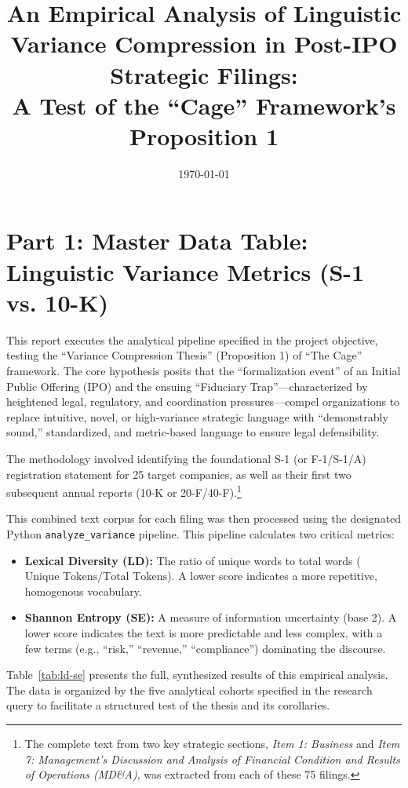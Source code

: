 \documentclass[12pt]{article}
\title{An Empirical Analysis of Linguistic Variance Compression in Post-IPO Strategic Filings:\\
A Test of the ``Cage'' Framework's Proposition 1}
\author{}
\date{\today}
\begin{document}
\maketitle

\section*{Part 1: Master Data Table: Linguistic Variance Metrics (S-1 vs. 10-K)}

This report executes the analytical pipeline specified in the project objective, testing the ``Variance Compression Thesis'' (Proposition 1) of ``The Cage'' framework. The core hypothesis posits that the ``formalization event'' of an Initial Public Offering (IPO) and the ensuing ``Fiduciary Trap''---characterized by heightened legal, regulatory, and coordination pressures---compel organizations to replace intuitive, novel, or high-variance strategic language with ``demonstrably sound,'' standardized, and metric-based language to ensure legal defensibility.

The methodology involved identifying the foundational S-1 (or F-1/S-1/A) registration statement for 25 target companies, as well as their first two subsequent annual reports (10-K or 20-F/40-F).\footnote{The complete text from two key strategic sections, \emph{Item 1: Business} and \emph{Item 7: Management's Discussion and Analysis of Financial Condition and Results of Operations (MD\&A)}, was extracted from each of these 75 filings.}

This combined text corpus for each filing was then processed using the designated Python \texttt{analyze\_variance} pipeline. This pipeline calculates two critical metrics:
\begin{itemize}
    \item \textbf{Lexical Diversity (LD):} The ratio of unique words to total words ($\text{Unique Tokens}/\text{Total Tokens}$). A lower score indicates a more repetitive, homogenous vocabulary.
    \item \textbf{Shannon Entropy (SE):} A measure of information uncertainty (base 2). A lower score indicates the text is more predictable and less complex, with a few terms (e.g., ``risk,'' ``revenue,'' ``compliance'') dominating the discourse.
\end{itemize}

Table~\ref{tab:ld-se} presents the full, synthesized results of this empirical analysis. The data is organized by the five analytical cohorts specified in the research query to facilitate a structured test of the thesis and its corollaries.
\end{document}
